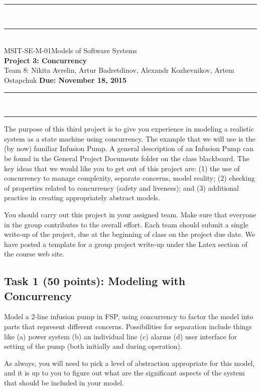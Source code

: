 \documentclass{article}
\newcommand{\head}{\subsection*}
\begin{document}
\begin{center}
\rule{\textwidth}{1.5pt} \\ \rule[10pt]{\textwidth}{1pt}\\
MSIT-SE-M-01\hfill Models of Software Systems\\[3ex]
{\Large\bf Project 3: Concurrency}\\[3ex]
Team 8: Nikita Avrelin, Artur Badretdinov, Alexandr Kozhevnikov, Artem Ostapchuk \hfill {\bf Due: November 18, 2015} \rule{\textwidth}{1pt}
\\\rule[9.5pt]{\textwidth}{1.5pt}
\end{center}

The purpose of this third project is to give you experience in
modeling a realistic system as a state machine using concurrency.
The example that we will use is the (by now) familiar Infusion Pump.
A general description of an Infusion Pump can be found in the
General Project Documents folder on the class blackboard. The key
ideas that we would like you to get out of this project are: (1) the
use of concurrency to manage complexity, separate concerns, model
reality; (2) checking of properties related to concurrency (safety
and liveness); and (3) additional practice in creating appropriately
abstract models.

\bigskip You should carry out this project in your assigned team. Make sure that everyone in the
group contributes to the overall effort. Each team should submit a single write-up of the project,
due at the beginning of class on the project due date. We have posted a template for a group
project write-up under the Latex section of the course web site.

\head{Task 1 (50 points): Modeling with Concurrency}

Model a 2-line infusion pump in FSP, using concurrency to factor the model into parts that
represent different concerns. Possibilities for separation include things like (a) power system (b) an individual line
(c) alarms (d) user interface for setting of the pump (both initially and during operation).

\bigskip

As always, you will need to pick a level of abstraction appropriate for this model, and it is up to
you to figure out what are the significant aspects of the system that should be included in your
model.\\
\end{document}

